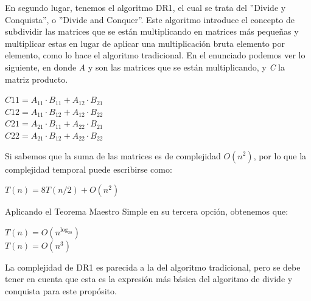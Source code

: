 \documentclass[12pt]{report}
\begin{document}
  En segundo lugar, tenemos el algoritmo DR1, el cual se trata del ''Divide y Conquista'', o ''Divide and Conquer''. Este algoritmo introduce el concepto de subdividir las matrices que se están multiplicando en matrices más pequeñas y multiplicar estas en lugar de aplicar una multiplicación bruta elemento por elemento, como lo hace el algoritmo tradicional. En el enunciado podemos ver lo siguiente, en donde \textit{A} y  son las matrices que se están multiplicando, y \textit{C} la matriz producto.
  
  \begin{center}
    $ C11 = A_{11} \cdot B_{11} + A_{12} \cdot B_{21} $\\
    $ C12 = A_{11} \cdot B_{12} + A_{12} \cdot B_{22}$\\
    $ C21 = A_{21} \cdot B_{11} + A_{22} \cdot B_{21} $\\
    $ C22 = A_{21} \cdot B_{12} + A_{22} \cdot B_{22} $\\
  \end{center}
  
  Si sabemos que la suma de las matrices es de complejidad $O(n^2)$, por lo que la complejidad temporal puede escribirse como:
  
  \begin{center}
    $ T(n) = 8T(n/2) + O(n^2) $
  \end{center}
  
  Aplicando el Teorema Maestro Simple en su tercera opción, obtenemos que:
  
  \begin{center}
    $ T(n) = O(n^{\log_28}) $ \\
    $ T(n) = O(n^3) $
  \end{center}
  
  La complejidad de DR1 es parecida a la del algoritmo tradicional, pero se debe tener en cuenta que esta es la expresión más básica del algoritmo de divide y conquista para este propósito.
  
  \begin{center}
  \end{center}
    
\end{document}
